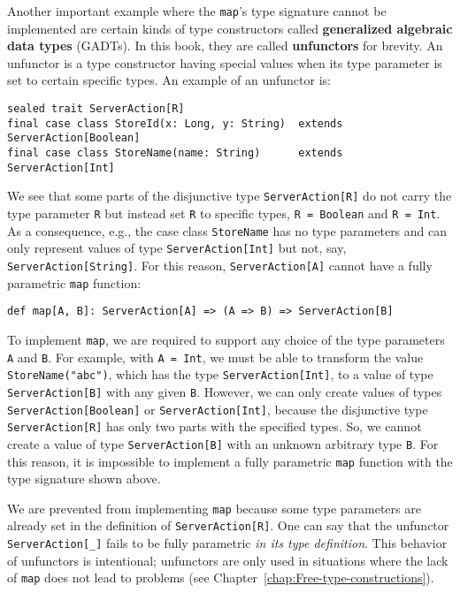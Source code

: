 Another important example where the \lstinline!map!\textsf{'}s type signature
cannot be implemented are certain kinds of type constructors called
\textbf{generalized algebraic
data types} (GADTs). In this book, they are called \textbf{unfunctors}
for brevity. An unfunctor is a type constructor having special values
when its type parameter is set to certain specific types. An example
of an unfunctor is:
\begin{lstlisting}
sealed trait ServerAction[R]
final case class StoreId(x: Long, y: String)  extends ServerAction[Boolean]
final case class StoreName(name: String)      extends ServerAction[Int]
\end{lstlisting}
We see that some parts of the disjunctive type \lstinline!ServerAction[R]!
do not carry the type parameter \lstinline!R! but instead set \lstinline!R!
to specific types, \lstinline!R = Boolean! and \lstinline!R = Int!.
As a consequence, e.g., the case class \lstinline!StoreName! has
no type parameters and can only represent values of type \lstinline!ServerAction[Int]!
but not, say, \lstinline!ServerAction[String]!. For this reason,
\lstinline!ServerAction[A]! cannot have a fully parametric \lstinline!map!
function:
\begin{lstlisting}
def map[A, B]: ServerAction[A] => (A => B) => ServerAction[B]
\end{lstlisting}
To implement \lstinline!map!, we are required to support any choice
of the type parameters \lstinline!A! and \lstinline!B!. For example,
with \lstinline!A = Int!, we must be able to transform the value
\lstinline!StoreName("abc")!, which has the type \lstinline!ServerAction[Int]!,
to a value of type \lstinline!ServerAction[B]! with any given \lstinline!B!.
However, we can only create values of types \lstinline!ServerAction[Boolean]!
or \lstinline!ServerAction[Int]!, because the disjunctive type \lstinline!ServerAction[R]!
has only two parts with the specified types. So, we cannot create
a value of type \lstinline!ServerAction[B]! with an unknown arbitrary
type \lstinline!B!. For this reason, it is impossible to implement
a fully parametric \lstinline!map! function with the type signature
shown above.

We are prevented from implementing \lstinline!map! because some type
parameters are already set in the definition of \lstinline!ServerAction[R]!.
One can say that the unfunctor \lstinline!ServerAction[_]! fails
to be fully parametric \emph{in its type definition}. This behavior
of unfunctors is intentional; unfunctors are only used in situations
where the lack of \lstinline!map! does not lead to problems (see
Chapter~\ref{chap:Free-type-constructions}).

